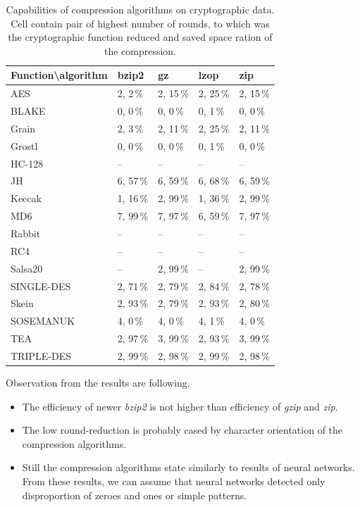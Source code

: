 \documentclass[
  print, %
  Table,   %
  nolof,     %
  nolot,     %
  11pt, %
  oneside  %
]{fithesis3}
\begin{document}
\begin{table}[H]
\centering{}
\begin{tabular}{l|p{1.8cm} p{1.8cm} p{1.8cm} p{1.8cm}}
Function\textbackslash{}algorithm & 
                bzip2   &   gz      &   lzop    &   zip     \\ \hline
AES         & 2, 2\,\%  & 2, 15\,\% & 2, 25\,\% & 2, 15\,\% \\
BLAKE       & 0, 0\,\%  & 0, 0\,\%  & 0, 1\,\%  & 0, 0\,\%  \\
Grain       & 2, 3\,\%  & 2, 11\,\% & 2, 25\,\% & 2, 11\,\% \\
Grostl      & 0, 0\,\%  & 0, 0\,\%  & 0, 1\,\%  & 0, 0\,\%  \\
HC-128      & --        & --        & --        & --        \\
JH          & 6, 57\,\% & 6, 59\,\% & 6, 68\,\% & 6, 59\,\% \\
Keccak      & 1, 16\,\% & 2, 99\,\% & 1, 36\,\% & 2, 99\,\% \\
MD6         & 7, 99\,\% & 7, 97\,\% & 6, 59\,\% & 7, 97\,\% \\
Rabbit      & --        & --        & --        & --        \\
RC4         & --        & --        & --        & --        \\
Salsa20     & --        & 2, 99\,\% & --        & 2, 99\,\% \\
SINGLE-DES  & 2, 71\,\% & 2, 79\,\% & 2, 84\,\% & 2, 78\,\% \\
Skein       & 2, 93\,\% & 2, 79\,\% & 2, 93\,\% & 2, 80\,\% \\
SOSEMANUK   & 4, 0\,\%  & 4, 0\,\%  & 4, 1\,\%  & 4, 0\,\%  \\
TEA         & 2, 97\,\% & 3, 99\,\% & 2, 93\,\% & 3, 99\,\% \\
TRIPLE-DES  & 2, 99\,\% & 2, 98\,\% & 2, 99\,\% & 2, 98\,\% 

\end{tabular}
\caption{Capabilities of compression algorithms on cryptographic data. Cell contain pair of highest number of rounds, to which was the cryptographic function reduced and saved space ration of the compression.}
\label{table:res-compression}
\end{table}

Observation from the results are following.

\begin{itemize}
    \item The efficiency of newer \textit{bzip2} is not higher than efficiency of \textit{gzip} and \textit{zip}.
    \item The low round-reduction is probably cased by character orientation of the compression algorithms.
    \item Still the compression algorithms state similarly to results of neural networks. From these results, we can assume that neural networks detected only disproportion of zeroes and ones or simple patterns.
\end{itemize}
\end{document}

